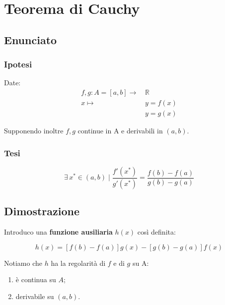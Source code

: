 \documentclass[../dimostrazioni]{subfiles}
\begin{document}
    \chapter{Teorema di Cauchy}
    \label{teoCauchy}

        \section*{Enunciato}

            \subsection*{Ipotesi}

                Date:
                \begin{align*}
                    f,g : A = [a, b] \longrightarrow \, &\mathbb{R}\\
                    x \longmapsto \, &y = f(x)\\
                                  &y = g(x) 
                \end{align*}

                Supponendo inoltre \(f, g\) continue in A e derivabili in \( (a,b) \).

            \subsection*{Tesi}

                \[ 
                    \exists \, x^* \in (a,b) \mid \frac{ f'(x^*) }{ g'(x^*) } = \frac{ f(b) - f(a) }{ g(b) - g(a) }
                \]

        \section*{Dimostrazione}

            Introduco una \textbf{funzione ausiliaria} \(h(x)\) così definita:

            \[ 
                h(x) = \left[f(b) - f(a)\right]g(x) - \left[g(b) - g(a)\right]f(x)
            \]

            Notiamo che \(h\) ha la regolarità di \(f\) e di \(g\) su A:
            \begin{enumerate}
                \indentitem \item è continua su \( A \);
                \indentitem \item derivabile su \( (a, b) \).
            \end{enumerate}
\end{document}
